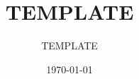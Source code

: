 \documentclass[12pt, a4paper]{article}
\title{TEMPLATE}
\author{TEMPLATE}
\date{\today}
\begin{document}


\tableofcontents
\listoffigures
\pagebreak

%
%

\end{document}
